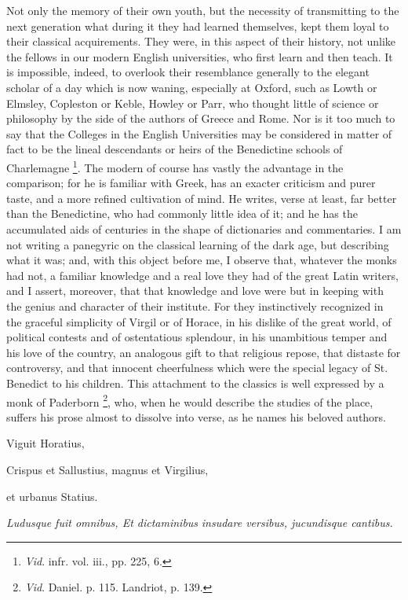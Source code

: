 Not only the memory of their own youth, but the necessity of
transmitting to the next generation what during it they had learned
themselves, kept them loyal to their classical acquirements. They
were, in this aspect of their history, not unlike the fellows in our
modern English universities, who first learn and then teach. It is
impossible, indeed, to overlook their resemblance generally to the
elegant scholar of a day which is now waning, especially at Oxford,
such as Lowth or Elmsley, Copleston or Keble, Howley or Parr, who
thought little of science or philosophy by the side of the authors of
Greece and Rome. Nor is it too much to say that the Colleges in the
English Universities may be considered in matter of fact to be the
lineal descendants or heirs of the Benedictine schools of Charlemagne
\footnote{\emph{Vid}.
infr. vol. iii., pp. 225, 6.}. The modern of course
has vastly the advantage in the comparison; for he is familiar with
Greek, has an exacter criticism and purer taste, and a more refined
cultivation of mind. He writes, verse at least, far better than the
Benedictine, who had commonly little idea of it; and he has the
accumulated aids of centuries in the shape of dictionaries and
commentaries. I am not writing a panegyric on the classical learning
of the dark age, but describing what it was; and, with this object
before me, I observe that, whatever the monks had not, a familiar
knowledge and a real love they had of the great Latin writers, and I
assert, moreover, that that knowledge and love were but in keeping
with the genius and character of their institute. For they
instinctively recognized in the graceful simplicity of Virgil or of
Horace, in his dislike of the great world, of political contests and
of ostentatious splendour, in his unambitious temper and his love of
the country, an analogous gift to that religious repose, that distaste
for controversy, and that innocent cheerfulness which were the special
legacy of St. Benedict to his children. This attachment to the
classics is well expressed by a monk of Paderborn \footnote{\emph{Vid}.
Daniel. p. 115. Landriot, p. 139.}, who, when he would describe the studies of the place, suffers
his prose almost to dissolve into verse, as he names his beloved
authors.

Viguit Horatius,

Crispus et Sallustius,
magnus et Virgilius,

et urbanus Statius.

\emph{Ludusque fuit omnibus, Et dictaminibus}
\emph{insudare versibus, jucundisque cantibus.}

